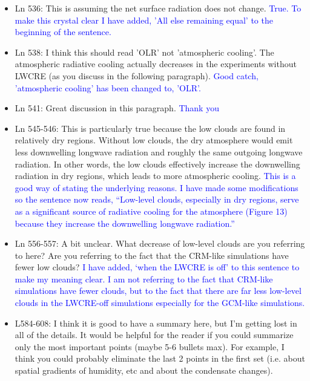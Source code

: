 \documentclass[draft]{agujournal2019}
\begin{document}
\begin{itemize}
  \item Ln 536: This is assuming the net surface radiation does not change.
  \textcolor{blue}{True.  To make this crystal clear I have added, 'All else remaining equal' to the beginning of the sentence.}
  
  \item Ln 538: I think this should read 'OLR' not 'atmospheric cooling'. The atmospheric radiative cooling actually decreases in the experiments without LWCRE (as you discuss in the following paragraph). 
  \textcolor{blue}{Good catch, 'atmospheric cooling' has been changed to, 'OLR'.}
  
  \item Ln 541: Great discussion in this paragraph.  
  \textcolor{blue}{Thank you}
  
  \item Ln 545-546: This is particularly true because the low clouds are found in relatively dry regions. Without low clouds, the dry atmosphere would emit less downwelling longwave radiation and roughly the same outgoing longwave radiation. In other words, the low clouds effectively increase the downwelling radiation in dry regions, which leads to more atmospheric cooling.   
  \textcolor{blue}{This is a good way of stating the underlying reasons.  I have made some modifications so the sentence now 
  reads, ``Low-level clouds, especially in dry regions, serve as a significant source of  radiative cooling for the atmosphere (Figure 
  13) because they increase the downwelling longwave radiation.''}
  
  \item Ln 556-557: A bit unclear. What decrease of low-level clouds are you referring to here? Are you referring to the fact that the CRM-like simulations have fewer low clouds?
  \textcolor{blue}{I have added, `when the LWCRE is off' to this sentence to make my meaning clear.  I am not referring to the fact that CRM-like simulations have fewer clouds, but to the fact that there are far less low-level clouds in the LWCRE-off simulations 
  especially for the GCM-like simulations. }
  
  \item L584-608: I think it is good to have a summary here, but I'm getting lost in all of the details. It would be helpful for the reader if you could summarize only the most important points (maybe 5-6 bullets max). For example, I think you could probably eliminate the last 2 points in the first set (i.e. about spatial gradients of humidity, etc and about the condensate changes). 


\end{itemize}
\end{document}
